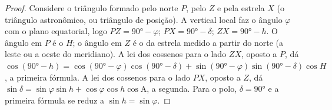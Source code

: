 \begin{proof}
Considere o triângulo formado pelo  norte $P$, pelo  $Z$ e pela estrela $X$ (o triângulo astronômico, ou triângulo de posição). A vertical local faz o ângulo $\varphi$ com o plano equatorial, logo $PZ =
\ang{90} - \varphi$; $PX = \ang{90} - \delta$; $ZX = \ang{90} - h$. O ângulo em $P$ é o  $H$; o ângulo em $Z$ é o  da estrela medido a partir do norte (a leste ou a oeste do meridiano). A lei dos cossenos para o lado $ZX$, oposto a $P$, dá $\cos(\ang{90} - h) = \cos(\ang{90} - \varphi)\cos(\ang{90} - \delta) +
\sin(\ang{90} - \varphi)\sin(\ang{90} - \delta)\cos H$, a primeira fórmula. A lei dos cossenos para o lado $PX$, oposto a $Z$, dá $\sin\delta = \sin\varphi\sin h + \cos\varphi\cos h\cos\mathrm{A}$, a segunda. Para o polo, $\delta = \ang{90}$ e a primeira fórmula se reduz a $\sin h = \sin\varphi$.
\end{proof}

